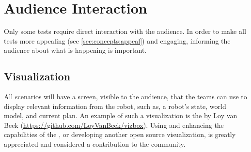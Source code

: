 \section{Audience Interaction}
\label{sec:rules:audience}
Only some tests require direct interaction with the audience. In order to make all tests more appealing (see \ref{sec:concepts:appeal}) and engaging, informing the audience about what is happening is important.

\subsection{Visualization}
\label{sec:rules:audience:visualization}
All scenarios will have a screen, visible to the audience, that the teams can use to display relevant information from the robot, such as, a robot's state, world model, and current plan. An example of such a visualization is the \VizBox{} by Loy van Beek (\url{https://github.com/LoyVanBeek/vizbox}). Using and enhancing the capabilities of the \VizBox{}, or developing another open source visualization, is greatly appreciated and considered a contribution to the \RoboCup\AtHome{} community.
